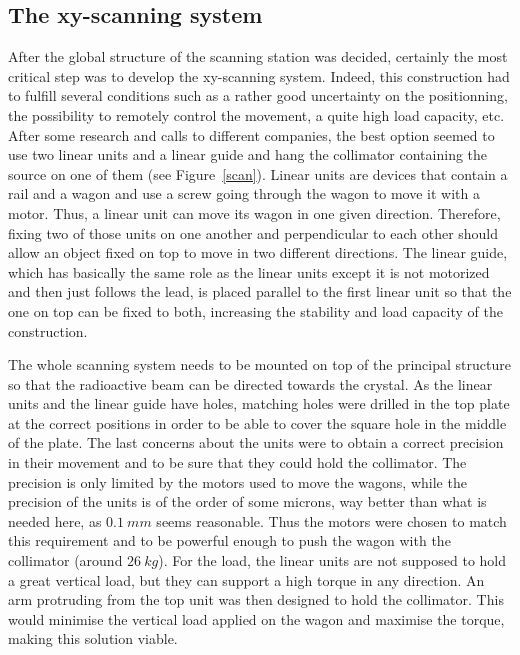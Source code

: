 \documentclass[11pt,a4paper]{article}
\begin{document}
\subsection{The xy-scanning system} \label{x-y}

After the global structure of the scanning station was decided, certainly the most critical step was to develop the xy-scanning system. Indeed, this construction had to fulfill several conditions such as a rather good uncertainty on the positionning, the possibility to remotely control the movement, a quite high load capacity, etc. After some research and calls to different companies, the best option seemed to use two linear units and a linear guide and hang the collimator containing the source on one of them (see Figure~\ref{scan}). Linear units are devices that contain a rail and a wagon and use a screw going through the wagon to move it with a motor. Thus, a linear unit can move its wagon in one given direction. Therefore, fixing two of those units on one another and perpendicular to each other should allow an object fixed on top to move in two different directions. The linear guide, which has basically the same role as the linear units except it is not motorized and then just follows the lead, is placed parallel to the first linear unit so that the one on top can be fixed to both, increasing the stability and load capacity of the construction.

The whole scanning system needs to be mounted on top of the principal structure so that the radioactive beam can be directed towards the crystal. As the linear units and the linear guide have holes, matching holes were drilled in the top plate at the correct positions in order to be able to cover the square hole in the middle of the plate. The last concerns about the units were to obtain a correct precision in their movement and to be sure that they could hold the collimator. The precision is only limited by the motors used to move the wagons, while the precision of the units is of the order of some microns, way better than what is needed here, as $0.1~mm$ seems reasonable. Thus the motors were chosen to match this requirement and to be powerful enough to push the wagon with the collimator (around $26~kg$). For the load, the linear units are not supposed to hold a great vertical load, but they can support a high torque in any direction. An arm protruding from the top unit was then designed to hold the collimator. This would minimise the vertical load applied on the wagon and maximise the torque, making this solution viable.
\end{document}
